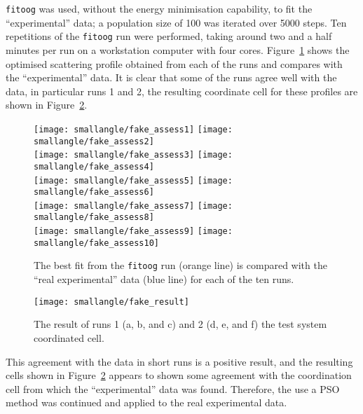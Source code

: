 \texttt{fitoog} was used, without the energy minimisation capability, to fit the ``experimental'' data; a population size of 100 was iterated over 5000 steps.
Ten repetitions of the \texttt{fitoog} run were performed, taking around two and a half minutes per run on a workstation computer with four cores.
Figure~\ref{fig:test_assess} shows the optimised scattering profile obtained from each of the runs and compares with the ``experimental'' data.
It is clear that some of the runs agree well with the data, in particular runs 1 and 2, the resulting coordinate cell for these profiles are shown in Figure~\ref{fig:fake_result}.
%
\begin{figure}
    \centering
    \texttt{[image: smallangle/fake\_assess1]}
    \texttt{[image: smallangle/fake\_assess2]} \\
    \texttt{[image: smallangle/fake\_assess3]}
    \texttt{[image: smallangle/fake\_assess4]} \\
    \texttt{[image: smallangle/fake\_assess5]}
    \texttt{[image: smallangle/fake\_assess6]} \\
    \texttt{[image: smallangle/fake\_assess7]}
    \texttt{[image: smallangle/fake\_assess8]} \\
    \texttt{[image: smallangle/fake\_assess9]}
    \texttt{[image: smallangle/fake\_assess10]}
    \caption{The best fit from the \texttt{fitoog} run (orange line) is compared with the ``real experimental'' data (blue line) for each of the ten runs.}
    \label{fig:test_assess}
\end{figure}
%
%
\begin{figure}
    \centering
    \texttt{[image: smallangle/fake\_result]}
    \caption{The result of runs 1 (a, b, and c) and 2 (d, e, and f) the test system coordinated cell.}
    \label{fig:fake_result}
\end{figure}
%

This agreement with the data in short runs is a positive result, and the resulting cells shown in Figure~\ref{fig:fake_result} appears to shown some agreement with the coordination cell from which the ``experimental'' data was found.
Therefore, the use a PSO method was continued and applied to the real experimental data.

